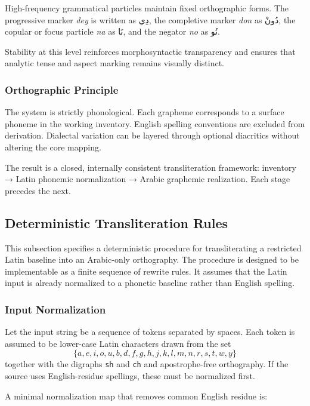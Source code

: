 \documentclass[12pt]{article}
\newcommand{\AR}[1]{\foreignlanguage{arabic}{#1}}
\begin{document}
High-frequency grammatical particles maintain fixed orthographic forms. The progressive marker \textit{dey} is written as \AR{دِي}, the completive marker \textit{don} as \AR{دُونْ}, the copular or focus particle \textit{na} as \AR{نَا}, and the negator \textit{no} as \AR{نُو}.

Stability at this level reinforces morphosyntactic transparency and ensures that analytic tense and aspect marking remains visually distinct.

\subsubsection{Orthographic Principle}

The system is strictly phonological. Each grapheme corresponds to a surface phoneme in the working inventory. English spelling conventions are excluded from derivation. Dialectal variation can be layered through optional diacritics without altering the core mapping.

The result is a closed, internally consistent transliteration framework: inventory → Latin phonemic normalization → Arabic graphemic realization. Each stage precedes the next.

\subsection{Deterministic Transliteration Rules}

This subsection specifies a deterministic procedure for transliterating a restricted Latin baseline into an Arabic-only orthography. The procedure is designed to be implementable as a finite sequence of rewrite rules. It assumes that the Latin input is already normalized to a phonetic baseline rather than English spelling.

\subsubsection{Input Normalization}

Let the input string be a sequence of tokens separated by spaces. Each token is assumed to be lower-case Latin characters drawn from the set
\[
\{a,e,i,o,u,b,d,f,g,h,j,k,l,m,n,r,s,t,w,y\}
\]
together with the digraphs \texttt{sh} and \texttt{ch} and apostrophe-free orthography. If the source uses English-residue spellings, these must be normalized first.

A minimal normalization map that removes common English residue is:
\end{document}
